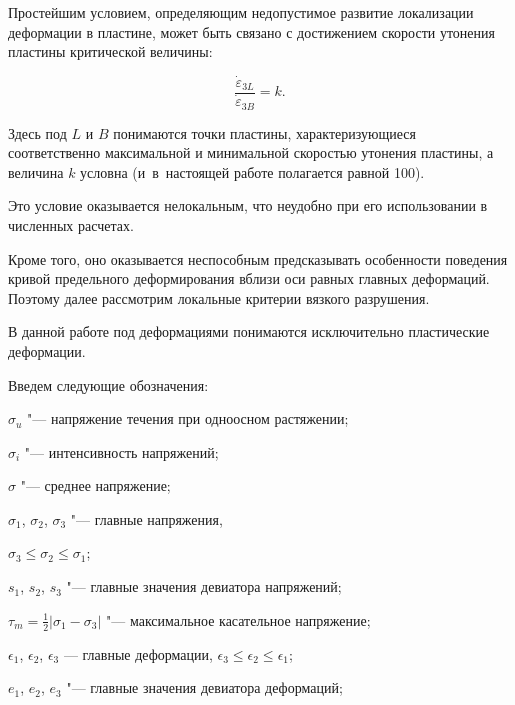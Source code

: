 \newpage




Простейшим условием, определяющим недопустимое развитие локализации деформации в пластине, может быть связано с достижением скорости утонения пластины критической величины:



\begin{equation}\label{keller:eq:19}

	\frac{\dot{\varepsilon}_{3L}}{\dot{\varepsilon}_{3B}} = k. 

\end{equation}



\noindent

Здесь под $L$ и $B$ понимаются точки пластины, характеризующиеся соответственно максимальной и минимальной скоростью утонения пластины, а величина $k$ условна (и~в~настоящей работе полагается равной 100). 

Это условие оказывается нелокальным, что неудобно при его использовании в численных расчетах. 

Кроме того, оно оказывается неспособным предсказывать особенности поведения кривой предельного деформирования вблизи оси равных главных деформаций. Поэтому далее рассмотрим локальные критерии вязкого разрушения.



В данной работе под деформациями понимаются исключительно пластические деформации. 



Введем следующие обозначения: 

$\sigma_u$ "--- напряжение течения при одноосном растяжении;

$\sigma_i$ "--- интенсивность напряжений; 

$\sigma$ "--- среднее напряжение; 

$\sigma_1$, $\sigma_2$, $\sigma_3$ "--- главные напряжения,

$\sigma_3\leq\sigma_2\leq\sigma_1$; 

$s_1$, $s_2$, $s_3$ "--- главные значения девиатора напряжений; 

$\tau_m=\frac{1}{2}|\sigma_1-\sigma_3|$ "--- максимальное касательное напряжение; 

$\epsilon_1$, $\epsilon_2$, $\epsilon_3$ --- главные деформации, $\epsilon_3\leq\epsilon_2\leq\epsilon_1$; 

$e_1$, $e_2$, $e_3$ "--- главные значения девиатора  деформаций; 

